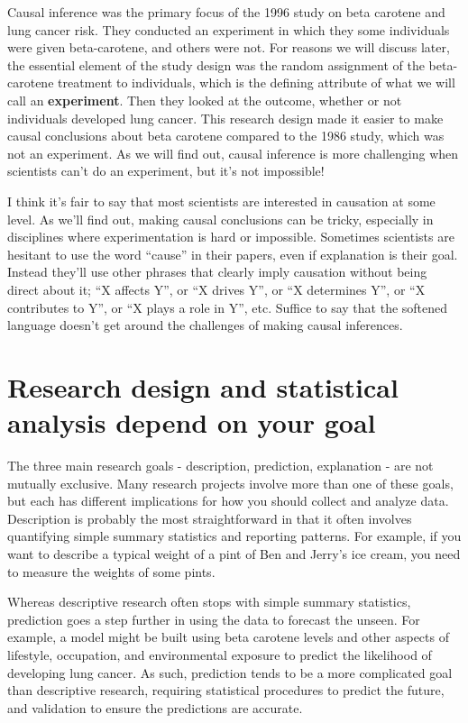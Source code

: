 \documentclass[
]{book}
\begin{document}
\begin{enumerate}
  Causal inference was the primary focus of the 1996 study on beta carotene and lung cancer risk. They conducted an experiment in which they some individuals were given beta-carotene, and others were not. For reasons we will discuss later, the essential element of the study design was the random assignment of the beta-carotene treatment to individuals, which is the defining attribute of what we will call an \textbf{experiment}. Then they looked at the outcome, whether or not individuals developed lung cancer. This research design made it easier to make causal conclusions about beta carotene compared to the 1986 study, which was not an experiment. As we will find out, causal inference is more challenging when scientists can't do an experiment, but it's not impossible!

  I think it's fair to say that most scientists are interested in causation at some level. As we'll find out, making causal conclusions can be tricky, especially in disciplines where experimentation is hard or impossible. Sometimes scientists are hesitant to use the word ``cause'' in their papers, even if explanation is their goal. Instead they'll use other phrases that clearly imply causation without being direct about it; ``X affects Y'', or ``X drives Y'', or ``X determines Y'', or ``X contributes to Y'', or ``X plays a role in Y'', etc. Suffice to say that the softened language doesn't get around the challenges of making causal inferences.
\end{enumerate}

\section{Research design and statistical analysis depend on your goal}\label{research-design-and-statistical-analysis-depend-on-your-goal}

The three main research goals - description, prediction, explanation - are not mutually exclusive. Many research projects involve more than one of these goals, but each has different implications for how you should collect and analyze data. Description is probably the most straightforward in that it often involves quantifying simple summary statistics and reporting patterns. For example, if you want to describe a typical weight of a pint of Ben and Jerry's ice cream, you need to measure the weights of some pints.

Whereas descriptive research often stops with simple summary statistics, prediction goes a step further in using the data to forecast the unseen. For example, a model might be built using beta carotene levels and other aspects of lifestyle, occupation, and environmental exposure to predict the likelihood of developing lung cancer. As such, prediction tends to be a more complicated goal than descriptive research, requiring statistical procedures to predict the future, and validation to ensure the predictions are accurate.
\end{document}

